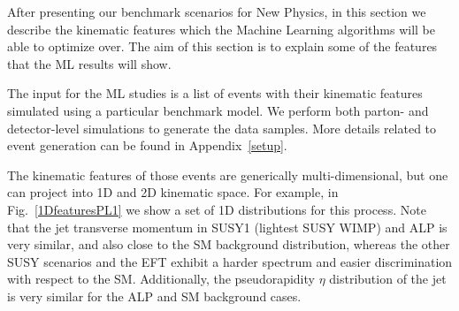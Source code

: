 \documentclass[prd,aps,letterpaper,floatfix,superscriptaddress,preprintnumbers,twocolumn,10pt,nofootinbib]{revtex4-1}
\begin{document}
After presenting our benchmark scenarios for New Physics, in this section we describe the kinematic features which the Machine Learning algorithms will be able to optimize over. The aim of this section is to explain some of the features that the ML results will show.

The input for the ML studies is a list of events with their kinematic features simulated using a particular benchmark model.  We perform both parton- and detector-level simulations to generate the data samples. More details related to event generation
can be found in Appendix~\ref{setup}.

The kinematic features of those events are generically multi-dimensional, but one can project into 1D and 2D kinematic space. For example, in Fig.~\ref{1DfeaturesPL1} we show a set of 1D distributions for this process. Note that the jet transverse momentum in SUSY1 (lightest SUSY WIMP) and ALP is very similar, and also close to the  SM background distribution, whereas the other SUSY scenarios and the EFT exhibit a harder spectrum and easier discrimination with respect to the SM. Additionally, the pseudorapidity $\eta$ distribution of the jet is very similar for the ALP and SM background cases. 
\end{document}
